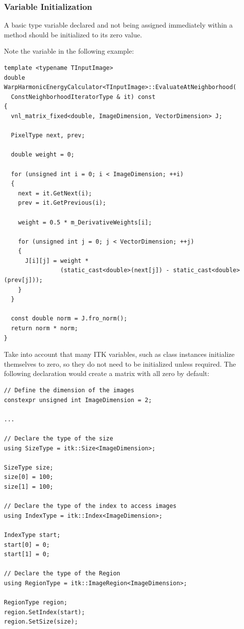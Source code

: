 \subsubsection{Variable Initialization}%
\label{subsubsec:VariableInitialization}

A basic type variable declared and not being assigned immediately within a
method should be initialized to its zero value.

Note the  variable in the following example:

\small
\begin{verbatim}
template <typename TInputImage>
double
WarpHarmonicEnergyCalculator<TInputImage>::EvaluateAtNeighborhood(
  ConstNeighborhoodIteratorType & it) const
{
  vnl_matrix_fixed<double, ImageDimension, VectorDimension> J;

  PixelType next, prev;

  double weight = 0;

  for (unsigned int i = 0; i < ImageDimension; ++i)
  {
    next = it.GetNext(i);
    prev = it.GetPrevious(i);

    weight = 0.5 * m_DerivativeWeights[i];

    for (unsigned int j = 0; j < VectorDimension; ++j)
    {
      J[i][j] = weight *
                (static_cast<double>(next[j]) - static_cast<double>(prev[j]));
    }
  }

  const double norm = J.fro_norm();
  return norm * norm;
}
\end{verbatim}
\normalsize

Take into account that many ITK variables, such as  class
instances initialize themselves to zero, so they do not need to be initialized
unless required. The following declaration would create a matrix with all zero
by default:

\small
\begin{verbatim}
// Define the dimension of the images
constexpr unsigned int ImageDimension = 2;

...

// Declare the type of the size
using SizeType = itk::Size<ImageDimension>;

SizeType size;
size[0] = 100;
size[1] = 100;

// Declare the type of the index to access images
using IndexType = itk::Index<ImageDimension>;

IndexType start;
start[0] = 0;
start[1] = 0;

// Declare the type of the Region
using RegionType = itk::ImageRegion<ImageDimension>;

RegionType region;
region.SetIndex(start);
region.SetSize(size);
\end{verbatim}
\normalsize


